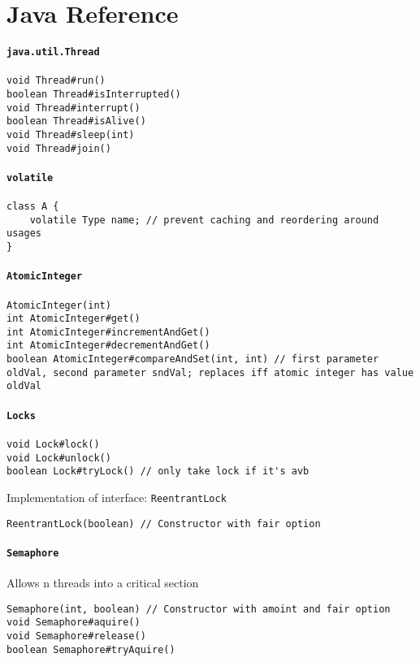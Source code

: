 \appendix\section{Java Reference}
\paragraph{\texttt{java.util.Thread}}
\begin{verbatim}
void Thread#run()
boolean Thread#isInterrupted()
void Thread#interrupt()
boolean Thread#isAlive()
void Thread#sleep(int)
void Thread#join()
\end{verbatim}
\paragraph{\texttt{volatile}}
\begin{verbatim}
class A {
    volatile Type name; // prevent caching and reordering around usages
}
\end{verbatim}
\paragraph{\texttt{AtomicInteger}}
\begin{verbatim}
AtomicInteger(int)
int AtomicInteger#get()
int AtomicInteger#incrementAndGet()
int AtomicInteger#decrementAndGet()
boolean AtomicInteger#compareAndSet(int, int) // first parameter oldVal, second parameter sndVal; replaces iff atomic integer has value oldVal
\end{verbatim}
\paragraph{\texttt{Locks}}
\begin{verbatim}
void Lock#lock()
void Lock#unlock()
boolean Lock#tryLock() // only take lock if it's avb
\end{verbatim}
Implementation of interface: \texttt{ReentrantLock}
\begin{verbatim}
ReentrantLock​(boolean) // Constructor with fair option
\end{verbatim}
\paragraph{\texttt{Semaphore}}
Allows n threads into a critical section
\begin{verbatim}
Semaphore(int, boolean) // Constructor with amoint and fair option
void Semaphore#aquire()
void Semaphore#release()
boolean Semaphore#tryAquire()
\end{verbatim}
